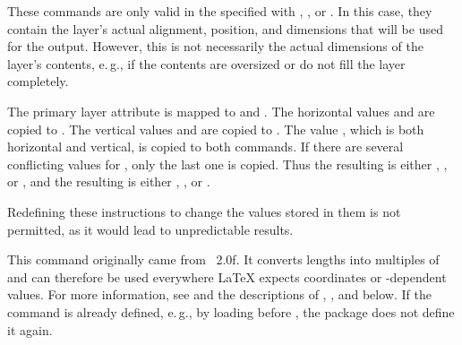 \begin{Declaration}
\end{Declaration}
These commands are only valid in the  specified with
, , or . In this
case, they contain the layer's actual alignment, position, and dimensions that
will be used for the output. However, this is not necessarily the actual
dimensions of the layer's contents, e.\,g., if the contents are oversized or
do not fill the layer completely.

The primary layer attribute  is mapped to
 and
. The horizontal values  and  are
copied to . The vertical values  and 
are copied to . The value , which is both
horizontal and vertical, is copied to both commands. If there are several
conflicting values for , only the last one is copied. Thus the
resulting  is either , , or ,
and the resulting  is either , , or
.

Redefining these instructions to change the values stored
in them is not permitted, as it would lead to unpredictable results.%
\EndIndexGroup


\begin{Declaration}
\end{Declaration}
This command originally came from
~2.0f. It converts lengths into
multiples of  and can therefore be used everywhere \LaTeX{}
expects  coordinates or -dependent
values. For more information, see \cite{package:eso-pic} and the descriptions
of , , and  below. If the command is
already defined, e.\,g., by loading  before
, the package does not define it again.%

\EndIndexGroup


